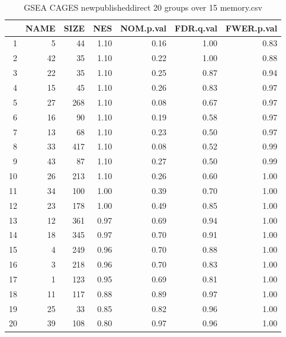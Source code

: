 \begin{table}[ht]
\centering
\begin{tabular}{rrrrrrr}
  \hline
 & NAME & SIZE & NES & NOM.p.val & FDR.q.val & FWER.p.val \\ 
  \hline
1 &   5 &  44 & 1.10 & 0.16 & 1.00 & 0.83 \\ 
  2 &  42 &  35 & 1.10 & 0.22 & 1.00 & 0.88 \\ 
  3 &  22 &  35 & 1.10 & 0.25 & 0.87 & 0.94 \\ 
  4 &  15 &  45 & 1.10 & 0.26 & 0.83 & 0.97 \\ 
  5 &  27 & 268 & 1.10 & 0.08 & 0.67 & 0.97 \\ 
  6 &  16 &  90 & 1.10 & 0.19 & 0.58 & 0.97 \\ 
  7 &  13 &  68 & 1.10 & 0.23 & 0.50 & 0.97 \\ 
  8 &  33 & 417 & 1.10 & 0.08 & 0.52 & 0.99 \\ 
  9 &  43 &  87 & 1.10 & 0.27 & 0.50 & 0.99 \\ 
  10 &  26 & 213 & 1.10 & 0.26 & 0.60 & 1.00 \\ 
  11 &  34 & 100 & 1.00 & 0.39 & 0.70 & 1.00 \\ 
  12 &  23 & 178 & 1.00 & 0.49 & 0.85 & 1.00 \\ 
  13 &  12 & 361 & 0.97 & 0.69 & 0.94 & 1.00 \\ 
  14 &  18 & 345 & 0.97 & 0.70 & 0.91 & 1.00 \\ 
  15 &   4 & 249 & 0.96 & 0.70 & 0.88 & 1.00 \\ 
  16 &   3 & 218 & 0.96 & 0.70 & 0.83 & 1.00 \\ 
  17 &   1 & 123 & 0.95 & 0.69 & 0.81 & 1.00 \\ 
  18 &  11 & 117 & 0.88 & 0.89 & 0.97 & 1.00 \\ 
  19 &  25 &  33 & 0.85 & 0.82 & 0.96 & 1.00 \\ 
  20 &  39 & 108 & 0.80 & 0.97 & 0.96 & 1.00 \\ 
   \hline
\end{tabular}
\caption{GSEA CAGES newpublisheddirect 20 groups over 15 memory.csv} 
\label{Table:GSEA CAGESmemory.csv newpublisheddirect 20 groups over 15}
\end{table}

